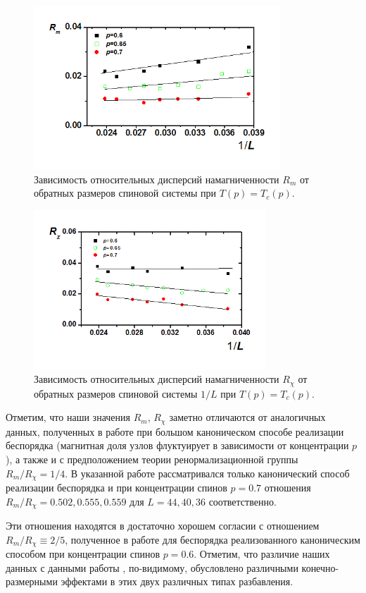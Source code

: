\begin{figure}[H]
	\centering
	\includegraphics[width=0.5\linewidth]{content/sections/images/phys2-1}
	\caption{Зависимость относительных дисперсий намагниченности $R_m$ от обратных размеров спиновой системы при $T(p)=T_c(p)$.}
	\label{phys2-pic-1}
\end{figure}

\begin{figure}[H]
	\centering
	\includegraphics[width=0.5\linewidth]{content/sections/images/phys2-2}
	\caption{Зависимость относительных дисперсий намагниченности $R_{\chi}$ от обратных размеров спиновой системы $1/L$ при $T(p)=T_c(p)$.}
	\label{phys2-pic-2}
\end{figure}


Отметим, что наши значения $R_m$, $R_\chi$ заметно отличаются от аналогичных данных, полученных в работе \cite{ph2_4} при большом каноническом способе реализации беспорядка (магнитная доля узлов флуктуирует в зависимости от концентрации $p$), а также и с предположением теории ренормализационной группы  $R_m / R_\chi = 1/4$. В указанной работе рассматривался только канонический способ реализации беспорядка и при концентрации спинов $p=0.7$ отношения $R_m / R_\chi =0.502, 0.555, 0.559$ для $L=44, 40, 36$ соответственно.

Эти отношения находятся в достаточно хорошем согласии с отношением $R_m / R_\chi \equiv 2/5$, полученное в работе \cite{ph2_1} для беспорядка реализованного каноническим способом при концентрации спинов $p=0.6$. Отметим, что различие наших данных с данными работы \cite{ph2_4}, по-видимому, обусловлено различными конечно-размерными эффектами в этих двух различных типах разбавления.


